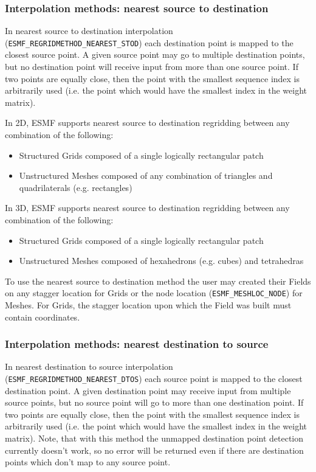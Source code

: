 \subsubsection{Interpolation methods: nearest source to destination}\label{sec:interpolation:neareststod}
In nearest source to destination interpolation ({\tt ESMF\_REGRIDMETHOD\_NEAREST\_STOD}) each destination point is mapped to the closest source point. A given source point may go to multiple destination points, but no destination point will receive input from more than one source point. If two points are equally close, then the point with the smallest sequence index is arbitrarily used (i.e. the point which would have the smallest index in the weight matrix). 

\smallskip

 In 2D, ESMF supports nearest source to destination regridding between any combination of the following:
 \begin{itemize}
 \item Structured Grids composed of a single logically rectangular patch
 \item Unstructured Meshes composed of any combination of triangles and quadrilaterals (e.g. rectangles)
 \end{itemize}

\smallskip

 In 3D, ESMF supports nearest source to destination regridding between any combination of the following:
 \begin{itemize}
 \item Structured Grids composed of a single logically rectangular patch
 \item Unstructured Meshes composed of hexahedrons (e.g. cubes) and tetrahedras
 \end{itemize}

\smallskip

 To use the nearest source to destination method the user may created their Fields on any stagger location for Grids or the node location ({\tt ESMF\_MESHLOC\_NODE}) for Meshes.
 For Grids, the stagger location upon which the Field was built must contain coordinates. 


\subsubsection{Interpolation methods: nearest destination to source}\label{sec:interpolation:nearestdtos}
In nearest destination to source interpolation ({\tt ESMF\_REGRIDMETHOD\_NEAREST\_DTOS}) each source point is mapped to the closest destination point. A given destination point may receive input from multiple source points, but no source point will go to more than one destination point. If two points are equally close, then the point with the smallest sequence index is arbitrarily used (i.e. the point which would have the smallest index in the weight matrix). Note, that with this method the unmapped destination point detection currently doesn't work, so no error will be returned even if there are destination points which don't map to any source point. 

